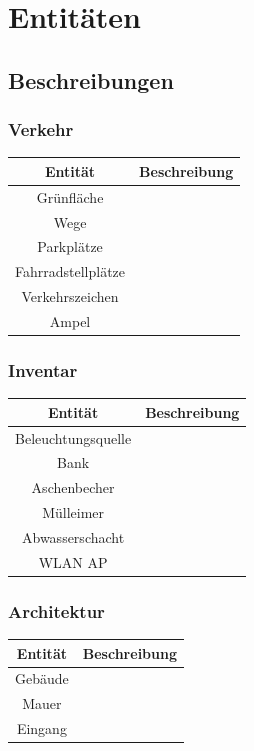 \documentclass[10pt]{scrartcl}
\begin{document}
\section{Entitäten}

	\subsection{Beschreibungen}
	
	\subsubsection{Verkehr}
	\begin{tabular}{|c|c|}
\hline Entität & Beschreibung \\ 
\hline
\hline Grünfläche &  \\ 
\hline Wege &  \\ 
\hline Parkplätze &  \\ 
\hline Fahrradstellplätze &  \\ 
\hline Verkehrszeichen &  \\ 
\hline Ampel &  \\ 
\hline 
\end{tabular} 

	\subsubsection{Inventar}
\begin{tabular}{|c|c|}
\hline Entität & Beschreibung \\
\hline
\hline Beleuchtungsquelle &  \\ 
\hline Bank &  \\ 
\hline Aschenbecher &  \\ 
\hline Mülleimer &  \\ 
\hline Abwasserschacht &  \\ 
\hline WLAN AP &  \\ 
\hline 
\end{tabular}

	\subsubsection{Architektur}
\begin{tabular}{|c|c|}
\hline Entität & Beschreibung \\
\hline	
\hline Gebäude &  \\ 
\hline Mauer &  \\ 
\hline Eingang &  \\ 
\hline 
\end{tabular} 
\end{document}
